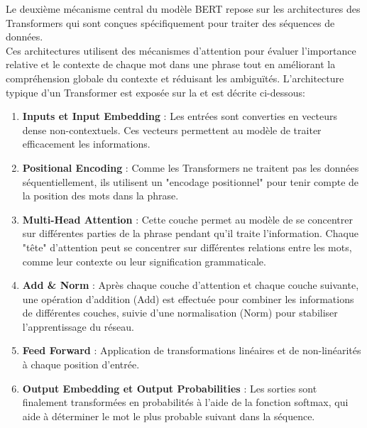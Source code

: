 \documentclass{rapport}
\begin{document}
\newpage
Le deuxième mécanisme central du modèle BERT repose sur les architectures des Transformers qui sont conçues spécifiquement pour traiter des séquences de données. \\Ces architectures utilisent des mécanismes d'attention pour évaluer l'importance relative et le contexte de chaque mot dans une phrase tout en améliorant la compréhension globale du contexte et réduisant les ambiguïtés. L'architecture typique d'un Transformer est exposée sur la  et est décrite ci-dessous:\\
\begin{enumerate}
    \item \textbf{Inputs et Input Embedding }: Les entrées sont converties en vecteurs dense non-contextuels. Ces vecteurs permettent au modèle de traiter efficacement les informations.

    \item \textbf{Positional Encoding} : Comme les Transformers ne traitent pas les données séquentiellement, ils utilisent un "encodage positionnel" pour tenir compte de la position des mots dans la phrase.

    \item \textbf{Multi-Head Attention} : Cette couche permet au modèle de se concentrer sur différentes parties de la phrase pendant qu'il traite l'information. Chaque "tête" d'attention peut se concentrer sur différentes relations entre les mots, comme leur contexte ou leur signification grammaticale.

    \item \textbf{Add \& Norm} : Après chaque couche d'attention et chaque couche suivante, une opération d'addition (Add) est effectuée pour combiner les informations de différentes couches, suivie d'une normalisation (Norm) pour stabiliser l'apprentissage du réseau.

    \item \textbf{Feed Forward} : Application de transformations linéaires et de non-linéarités à chaque position d'entrée.

    \item \textbf{Output Embedding et Output Probabilities} : Les sorties sont finalement transformées en probabilités à l'aide de la fonction softmax, qui aide à déterminer le mot le plus probable suivant dans la séquence.
\end{enumerate}
\end{document}
